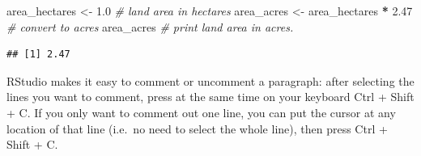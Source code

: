 \documentclass[]{book}
\newenvironment{Shaded}{\begin{snugshade}}{\end{snugshade}}
\newcommand{\FloatTok}[1]{\textcolor[rgb]{0.00,0.00,0.81}{#1}}
\newcommand{\StringTok}[1]{\textcolor[rgb]{0.31,0.60,0.02}{#1}}
\newcommand{\CommentTok}[1]{\textcolor[rgb]{0.56,0.35,0.01}{\textit{#1}}}
\newcommand{\OperatorTok}[1]{\textcolor[rgb]{0.81,0.36,0.00}{\textbf{#1}}}
\newcommand{\NormalTok}[1]{#1}
\begin{document}
\begin{Shaded}
\begin{Highlighting}[]
\NormalTok{area_hectares <-}\StringTok{ }\FloatTok{1.0}            \CommentTok{# land area in hectares}
\NormalTok{area_acres <-}\StringTok{ }\NormalTok{area_hectares }\OperatorTok{*}\StringTok{ }\FloatTok{2.47}  \CommentTok{# convert to acres}
\NormalTok{area_acres              }\CommentTok{# print land area in acres.}
\end{Highlighting}
\end{Shaded}

\begin{verbatim}
## [1] 2.47
\end{verbatim}

RStudio makes it easy to comment or uncomment a paragraph: after
selecting the lines you want to comment, press at the same time on your
keyboard Ctrl + Shift + C. If you only want to comment out one line, you
can put the cursor at any location of that line (i.e.~no need to select
the whole line), then press Ctrl + Shift + C.
\end{document}
